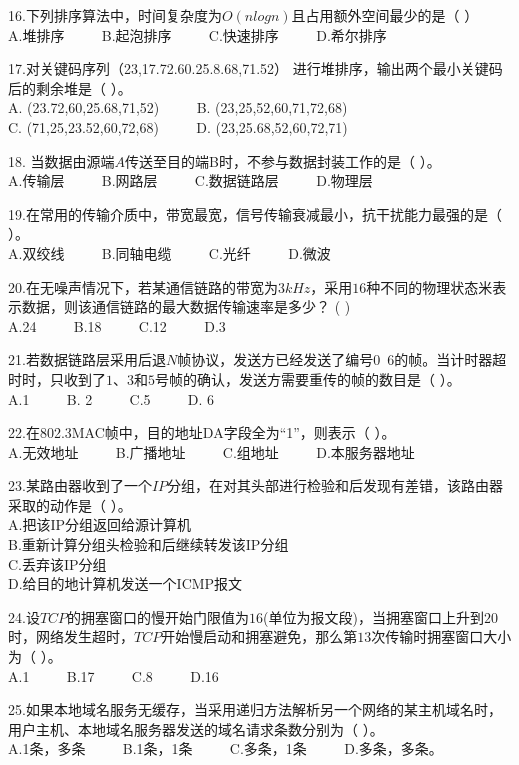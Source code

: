 16.下列排序算法中，时间复杂度为$O(nlogn)$且占用额外空间最少的是（    ） \\
A.堆排序 $\qquad$ B.起泡排序 $\qquad$ C.快速排序 $\qquad$ D.希尔排序

17.对关键码序列（23,17.72.60.25.8.68,71.52） 进行堆排序，输出两个最小关键码后的剩余堆是（    ）。 \\
A. (23.72,60,25.68,71,52) $\qquad$ B. (23,25,52,60,71,72,68) \\
C. (71,25,23.52,60,72,68) $\qquad$ D. (23,25.68,52,60,72,71)

18. 当数据由源端$A$传送至目的端B时，不参与数据封装工作的是（    ）。 \\
A.传输层 $\qquad$ B.网路层 $\qquad$ C.数据链路层 $\qquad$ D.物理层

19.在常用的传输介质中，带宽最宽，信号传输衰减最小，抗干扰能力最强的是（    ）。 \\
A.双绞线 $\qquad$ B.同轴电缆 $\qquad$ C.光纤 $\qquad$ D.微波

20.在无噪声情况下，若某通信链路的带宽为$3kHz$，采用$16$种不同的物理状态米表示数据，则该通信链路的最大数据传输速率是多少？ (    ) \\
A.24 $\qquad$ B.18 $\qquad$ C.12 $\qquad$ D.3

21.若数据链路层采用后退$N$帧协议，发送方已经发送了编号$0$~$6$的帧。当计时器超时时，只收到了$1$、$3$和$5$号帧的确认，发送方需要重传的帧的数目是（    ）。 \\
A.1 $\qquad$ B. 2 $\qquad$ C.5 $\qquad$ D. 6

22.在802.3MAC帧中，目的地址DA字段全为“1”，则表示（    ）。 \\
A.无效地址 $\qquad$ B.广播地址 $\qquad$ C.组地址 $\qquad$ D.本服务器地址

23.某路由器收到了一个$IP$分组，在对其头部进行检验和后发现有差错，该路由器采取的动作是（    ）。 \\
A.把该IP分组返回给源计算机 \\
B.重新计算分组头检验和后继续转发该IP分组 \\
C.丢弃该IP分组 \\
D.给目的地计算机发送一个ICMP报文

24.设$TCP$的拥塞窗口的慢开始门限值为$16$(单位为报文段)，当拥塞窗口上升到$20$时，网络发生超时，$TCP$开始慢启动和拥塞避免，那么第$13$次传输时拥塞窗口大小为（    ）。 \\
A.1 $\qquad$ B.17 $\qquad$ C.8 $\qquad$ D.16

25.如果本地域名服务无缓存，当采用递归方法解析另一个网络的某主机域名时，用户主机、本地域名服务器发送的域名请求条数分别为（    ）。 \\
A.1条，多条 $\qquad$ B.1条，1条 $\qquad$ C.多条，1条 $\qquad$ D.多条，多条。

